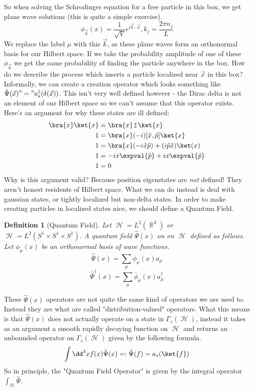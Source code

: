 \documentclass{article}
\DeclareMathOperator{\Hh}{{\mathcal{H}}}
\DeclareMathOperator{\RR}{\mathbb{R}}
\DeclareMathOperator{\II}{\mathbb{I}}
\newtheorem{defn}{Definition}
\begin{document}
So when solving the Schrodinger equation for a free particle in this box, we get plane wave solutions (this is quite a simple exercise).
\[\phi_{\vec{k}}(x) = \frac{1}{\sqrt{V}}e^{i\vec{k}\cdot\vec{x}},  k_j =\frac{2\pi n_j}{L} \]
We replace the label $\mu$ with this $\vec{k}$, as these plane waves form an orthonormal basis for our Hilbert space. If we take the probability amplitude of one of these $\phi_{\vec{k}}$ we get the same probability of finding the particle anywhere in the box. How do we describe the process which inserts a particle localized near $\vec{x}$ in this box? Informally, we can create a creation operator which looks something like $\hat\Psi(\vec{x}) "=" a_s^\dagger(\delta(\vec{x}))$. This isn't very well defined however - the Dirac delta is not an element of our Hilbert space so we can't assume that this operator exists. Here's an argument for why these states are ill defined:
\begin{align}
\bra{x}\ket{x}&= \bra{x}\II\ket{x}\\
1 &= \bra{x}(-i)[\hat x, \hat p]\ket{x}\\
1 &= \bra{x}(-i\hat x\hat p) + (i\hat p \hat x)\ket(x)\\
1 &= -ix\expval{\hat p} + ix\expval{\hat p} \\
1 &= 0
\end{align}
Why is this argument valid? Because position eigenstates are \textit{not} defined! They aren't honest residents of Hilbert space. What we can do instead is deal with gaussian states, or tightly localized but non-delta states. In order to make creating particles in localized states nice, we should define a Quantum Field.

\begin{defn}[Quantum Field]
Let $\Hh = L^2(\RR^3)$ or $\Hh = L^2(S^1\times S^1 \times S^1)$. A quantum field $\hat\Psi(x)$ on on $\Hh$ defined as follows. Let $\phi_\mu(x)$ be an orthonormal basis of wave functions.
\begin{equation}
\hat \Psi(x)= \sum_{\mu}\phi_\mu(x)a_\mu
\end{equation}
\begin{equation}
\hat \Psi^\dagger(x)= \sum_{\mu}\overline\phi_\mu(x)a^\dagger_\mu
\end{equation}
\end{defn}

These $\hat \Psi(x)$ operators are not quite the same kind of operators we are used to. Instead they are what are called "distribution-valued" operators. What this means is that $\hat\Psi(x)$ does not actually operate on a state in $\Gamma_s(\Hh)$, instead it takes as an argument a smooth rapidly decaying function on $\Hh$ and returns an unbounded operator on $\Gamma_s(\Hh)$ given by the following formula.
\begin{equation}
\int \dd^3 x f(x) \hat \Psi(x) =: \hat \Psi(f) = a_s(\ket{f})
\end{equation}
So in principle, the "Quantum Field Operator" is given by the integral operator $\int_{\Hh }\hat\Psi$.
\end{document}
